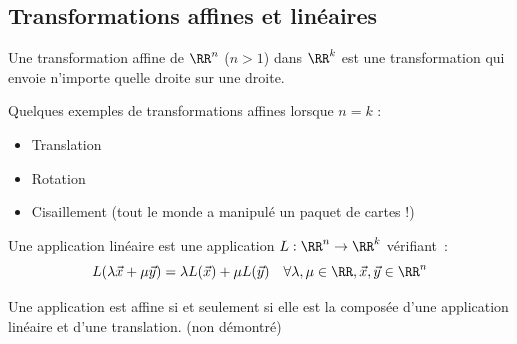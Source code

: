 \subsection {Transformations affines et linéaires}
\begin{frame}
  \begin{definition}
    Une transformation affine de \(\RR^n\) (\(n > 1\)) dans \(\RR^k\) est une transformation qui envoie n'importe quelle droite sur une droite.
  \end{definition}\pause{}
  \begin{example}Quelques exemples de transformations affines lorsque \(n = k\) :\pause{}
    \begin{itemize}[<+->]
    \item Translation
    \item Rotation
    \item Cisaillement (tout le monde a manipulé un paquet de cartes !)
    \end{itemize}
  \end{example}\pause{}
  \begin{definition}
    Une application linéaire est une application \(L : \RR^n \to \RR^k\) vérifiant~:\pause{}
    \begin{equation*}
       L(\lambda \vec{x} + \mu \vec{y}) = \lambda L(\vec{x}) + \mu L(\vec{y})\quad \forall \lambda,\mu \in \RR, \vec{x}, \vec{y}\in\RR^{n}
    \end{equation*}
  \end{definition}\pause{}
  \begin{theorem}
    Une application est affine si et seulement si elle est la composée d'une application linéaire et d'une translation.  (non démontré)
  \end{theorem}
\end{frame}
